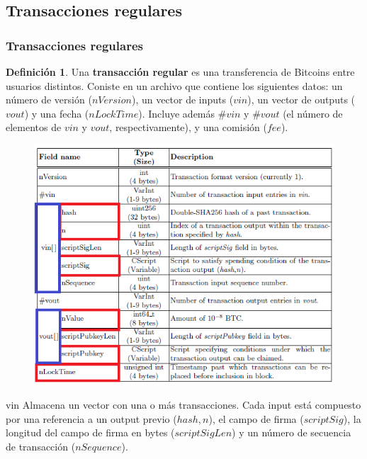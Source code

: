 \documentclass{beamer}
\theoremstyle{definition}
\newtheorem{defi}{Definición}
\begin{document}
\subsection{Transacciones regulares}
\begin{frame}
\frametitle{Transacciones regulares}
\begin{defi}
	Una \textbf{transacción regular} es una transferencia de Bitcoins entre usuarios distintos. Coniste en un archivo que contiene los siguientes datos: un número de versión ($nVersion$), un vector de inputs ($vin$), un vector de outputs ($vout$) y una fecha ($nLockTime$). Incluye además $\# vin$ y $\# vout$ (el número de elementos de $vin$ y $vout$, respectivamente), y una comisión ($fee$). 
\end{defi}

\end{frame}

\begin{frame}
	\begin{figure}
		\includegraphics[scale=0.5]{regular}
	\end{figure}
\end{frame}


\begin{frame}

\begin{block}{vin}
	Almacena un vector con una o más transacciones. Cada input está compuesto por una referencia a un output previo ($hash,n$), el campo de firma ($scriptSig$), la longitud del campo de firma en bytes ($scriptSigLen$) y un número de secuencia de transacción ($nSequence$).
\end{block}
\end{frame}
\end{document}
